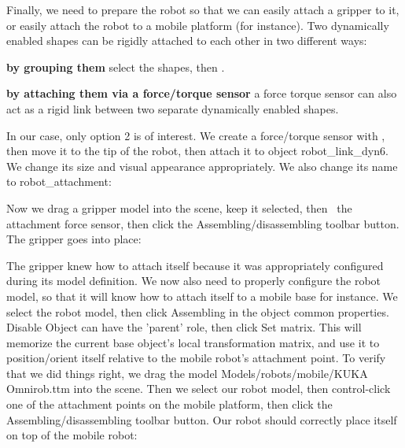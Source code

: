 Finally, we need to prepare the robot so that we can easily attach a gripper 
to it, or easily attach the robot to a mobile platform (for instance). Two 
dynamically enabled shapes can be rigidly attached to each other in two 
different ways:
\begin{description}
\item{\textbf{by grouping them}}
select the shapes, then .
\item{\textbf{by attaching them via a force/torque sensor}}
a force torque sensor can also act as a rigid link between two separate 
dynamically enabled shapes.
\end{description}

In our case, only option 2 is of interest. We create a force/torque sensor 
with , then move it to the tip of the robot, 
then attach it to object robot\_link\_dyn6. We change its size and visual 
appearance appropriately. We also 
change its name to robot\_attachment:


Now we drag a gripper model into the scene, keep it selected, then 
\ the attachment force sensor, then click the 
Assembling/disassembling toolbar button. The gripper goes into place:


The gripper knew how to attach itself because it was appropriately configured 
during its model definition. We now also need to properly configure the robot 
model, so that it will know how to attach itself to a mobile base for instance.
We select the robot model, then click Assembling in the object common 
properties. Disable Object can have the 'parent' role, then click Set matrix. 
This will memorize the current base object's local transformation matrix, and 
use it to position/orient itself relative to the mobile robot's attachment
point. To verify that we did things right, we drag the model
Models/robots/mobile/KUKA Omnirob.ttm into the scene. Then we select our 
robot model, then control-click one of the attachment points on the mobile 
platform, then click the Assembling/disassembling toolbar button. Our robot
should correctly place itself on top of the mobile robot:

